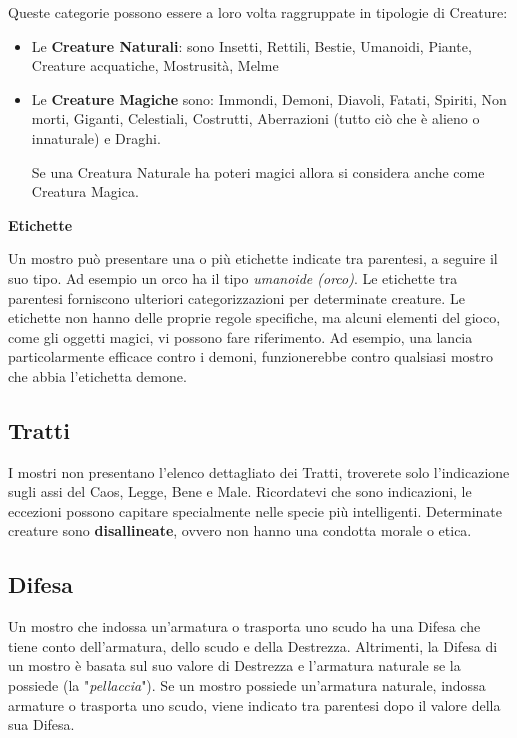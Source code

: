 \begin{multicols}{2}
\medskip

Queste categorie possono essere a loro volta raggruppate in tipologie di Creature:
\smallskip
\begin{itemize}[leftmargin=*] \setlength{\itemsep}{0pt}
\item
Le \textbf{Creature Naturali}: sono Insetti, Rettili, Bestie, Umanoidi, Piante, Creature acquatiche, Mostrusità, Melme
\item
Le \textbf{Creature Magiche} sono: Immondi, Demoni, Diavoli, Fatati, Spiriti, Non morti, Giganti, Celestiali, Costrutti, Aberrazioni (tutto ciò che è alieno o innaturale) e Draghi.

Se una Creatura Naturale ha poteri magici allora si considera anche come Creatura Magica.
\end{itemize}


\medskip\textbf{Etichette}

Un mostro può presentare una o più etichette indicate tra parentesi, a seguire il suo tipo. Ad esempio un orco ha il tipo \emph{umanoide (orco)}. Le etichette tra parentesi forniscono ulteriori categorizzazioni per determinate creature. Le etichette non hanno delle proprie regole specifiche, ma alcuni elementi del gioco, come gli oggetti magici, vi possono fare riferimento. Ad esempio, una lancia particolarmente efficace contro i demoni, funzionerebbe contro qualsiasi mostro che abbia l'etichetta demone.

\subsection{Tratti}

I mostri non presentano l'elenco dettagliato dei Tratti, troverete solo l'indicazione sugli assi del Caos, Legge, Bene e Male. Ricordatevi che sono indicazioni, le eccezioni possono capitare specialmente nelle specie più intelligenti.
Determinate creature sono \textbf{disallineate}, ovvero non hanno una condotta morale o etica.

\subsection{Difesa}

Un mostro che indossa un'armatura o trasporta uno scudo ha una Difesa che tiene conto dell'armatura, dello scudo e della Destrezza. Altrimenti, la Difesa di un mostro è basata sul suo valore di Destrezza e l'armatura naturale se la possiede (la "\emph{pellaccia}"). Se un mostro possiede un'armatura naturale, indossa armature o trasporta uno scudo, viene indicato tra parentesi dopo il valore della sua Difesa.


\end{multicols}
